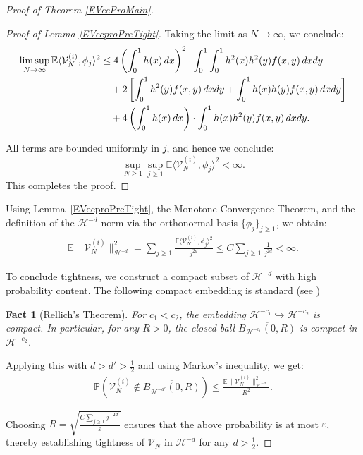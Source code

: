 \documentclass[11pt, reqno]{amsart}
\numberwithin{equation}{section}
\newtheorem{fact}{Fact}[section]
\begin{document}
\begin{proof}[Proof of Theorem \ref{EVecProMain}]
\begin{proof}[Proof of Lemma \ref{EVecproPreTight}]
Taking the limit as \( N \to \infty \), we conclude:
\begin{align}
\limsup_{N \to \infty} \mathbb{E} \langle \mathcal V^{(i)}_N, \phi_j \rangle^2 
&\le 4 \left( \int_0^1 h(x)\,dx \right)^2 \cdot \int_0^1 \int_0^1 h^2(x) h^2(y) f(x,y)\,dxdy \notag \\
&\quad + 2 \left[ \int_0^1 h^2(y) f(x,y)\,dxdy + \int_0^1 h(x) h(y) f(x,y)\,dxdy \right] \notag \\
&\quad + 4 \left( \int_0^1 h(x)\,dx \right) \cdot \int_0^1 h(x) h^2(y) f(x,y)\,dxdy. \label{EVecproTight1.2}
\end{align}

All terms are bounded uniformly in \( j \), and hence we conclude:
\[
\sup_{N \ge 1} \sup_{j \ge 1} \mathbb{E} \langle \mathcal V^{(i)}_N, \phi_j \rangle^2 < \infty.
\]
This completes the proof.
\end{proof}





Using Lemma~\ref{EVecproPreTight}, the Monotone Convergence Theorem, and the definition of the $\mathcal{H}^{-d}$-norm via the orthonormal basis $\{\phi_j\}_{j \ge 1}$, we obtain:
\begin{align}
\label{EVecProMain.1}
\mathbb{E}\|\mathcal V_N^{(i)}\|_{\mathcal{H}^{-d}}^2 = \sum_{j \ge 1} \frac{ \mathbb{E} \langle \mathcal V_N^{(i)}, \phi_j \rangle^2 }{j^{2d}} \le C \sum_{j \ge 1} \frac{1}{j^{2d}} < \infty.
\end{align}

To conclude tightness, we construct a compact subset of $\mathcal{H}^{-d}$ with high probability content. The following compact embedding is standard (see \cite{cipriani2019scaling})
\begin{fact}[Rellich's Theorem]
For $c_1 < c_2$, the embedding $\mathcal{H}^{-c_1} \hookrightarrow \mathcal{H}^{-c_2}$ is compact. In particular, for any $R > 0$, the closed ball $\overline{B_{\mathcal{H}^{-c_1}}(0,R)}$ is compact in $\mathcal{H}^{-c_2}$.
\end{fact}

Applying this with $d > d' > \frac{1}{2}$ and using Markov's inequality, we get:
\begin{align}
\label{EVecProMain.2}
\mathbb{P}\left( \mathcal V_N^{(i)} \notin \overline{B_{\mathcal{H}^{-d'}}(0, R)} \right) \le \frac{ \mathbb{E} \|\mathcal V_N^{(i)}\|_{\mathcal{H}^{-d'}}^2 }{R^2}.
\end{align}

Choosing $R = \sqrt{ \frac{C \sum_{j \ge 1} j^{-2d'}}{\varepsilon} }$ ensures that the above probability is at most $\varepsilon$, thereby establishing tightness of $\mathcal V_N$ in $\mathcal{H}^{-d}$ for any $d > \frac{1}{2}$.


\end{proof}
\end{document}
